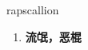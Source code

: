 
\begin{frame}
{\huge rapscallion}
\begin{center}
\begin{enumerate}\Large
  \item \textbf{流氓，恶棍}
\end{enumerate}
\end{center}
\end{frame}
